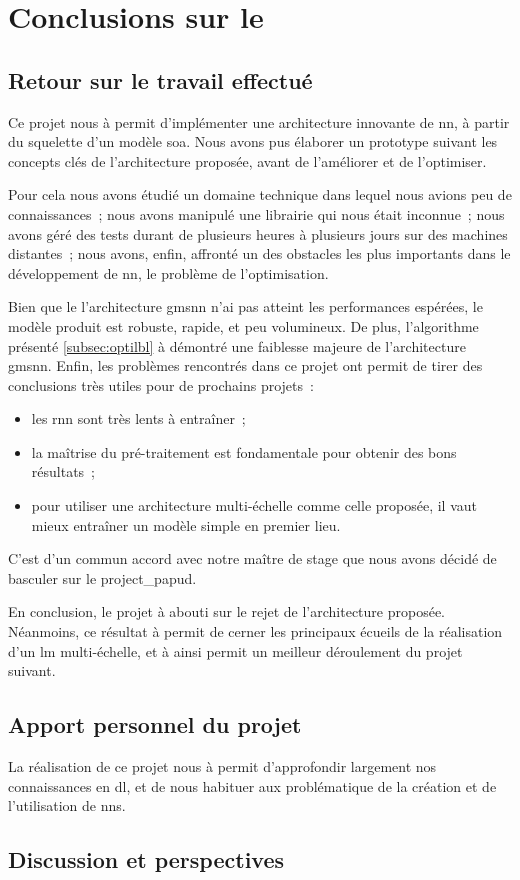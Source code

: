 \chapter{Conclusions sur le }
\section{Retour sur le travail effectué}
Ce projet nous à permit d'implémenter une architecture innovante de \gls{nn}, à partir du squelette d'un modèle \gls{soa}.
Nous avons pus élaborer un prototype suivant les concepts clés de l'architecture proposée, avant de l'améliorer et de l'optimiser.

Pour cela nous avons étudié un domaine technique dans lequel nous avions peu de connaissances~; nous avons manipulé une librairie qui nous était inconnue~;
nous avons géré des tests durant de plusieurs heures à plusieurs jours sur des machines distantes~; nous avons, enfin, affronté un des obstacles les plus importants dans le développement de \gls{nn}, le problème de l'optimisation.

Bien que le l'architecture \gls{gmsnn} n'ai pas atteint les performances espérées, le modèle produit est robuste, rapide, et peu volumineux.
De plus, l'algorithme présenté \autoref{subsec:optilbl} à démontré une faiblesse majeure de l'architecture \gls{gmsnn}.
Enfin, les problèmes rencontrés dans ce projet ont permit de tirer des conclusions très utiles pour de prochains projets~:
\begin{itemize}
	\item les \gls{rnn} sont très lents à entraîner~;
	\item la maîtrise du pré-traitement est fondamentale pour obtenir des bons résultats~;
	\item pour utiliser une architecture multi-échelle comme celle proposée, il vaut mieux entraîner un modèle simple en premier lieu.
\end{itemize}\hspace{1em}

C'est d'un commun accord avec notre maître de stage que nous avons décidé de basculer sur le \gls{project_papud}.

En conclusion, le projet à abouti sur le rejet de l'architecture proposée.
Néanmoins, ce résultat à permit de cerner les principaux écueils de la réalisation d'un \gls{lm} multi-échelle, et à ainsi permit un meilleur déroulement du projet suivant.


\section{Apport personnel du projet}
La réalisation de ce projet nous à permit d'approfondir largement nos connaissances en \gls{dl}, et de nous habituer aux problématique de la création et de l'utilisation de \glspl{nn}.

\section{Discussion et perspectives}
